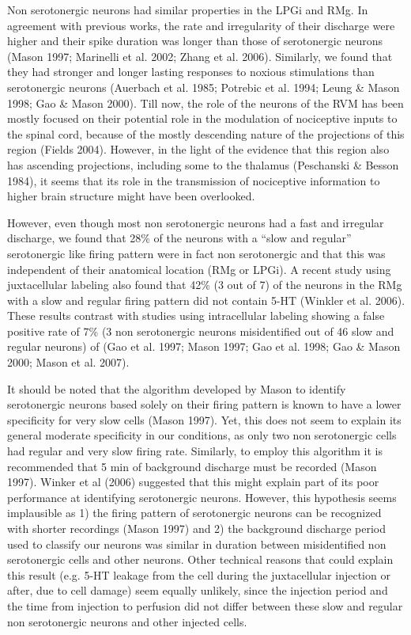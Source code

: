 \documentclass[a4paper,12pt,twoside]{report}
\begin{document}
Non serotonergic neurons had similar properties in the LPGi and RMg. In agreement with previous works, the rate and irregularity of their discharge were higher and their spike duration was longer than those of serotonergic neurons (Mason 1997; Marinelli et al. 2002; Zhang et al. 2006). Similarly, we found that they had stronger and longer lasting responses to noxious stimulations than serotonergic neurons (Auerbach et al. 1985; Potrebic et al. 1994; Leung \& Mason 1998; Gao \& Mason 2000). Till now, the role of the neurons of the RVM has been mostly focused on their potential role in the modulation of nociceptive inputs to the spinal cord, because of the mostly descending nature of the projections of this region (Fields 2004). However, in the light of the evidence that this region also has ascending projections, including some to the thalamus (Peschanski \& Besson 1984), it seems that its role in the transmission of nociceptive information to higher brain structure might have been overlooked. 

However, even though most non serotonergic neurons had a fast and irregular discharge, we found that 28\% of the neurons with a “slow and regular” serotonergic like firing pattern were in fact non serotonergic and that this was independent of their anatomical location (RMg or LPGi). A recent study using juxtacellular labeling also found that 42\% (3 out of 7) of the neurons in the RMg with a slow and regular firing pattern did not contain 5-HT (Winkler et al. 2006). These results contrast with studies using intracellular labeling showing a false positive rate of 7\% (3 non serotonergic neurons misidentified out of 46 slow and regular neurons) of (Gao et al. 1997; Mason 1997; Gao et al. 1998; Gao \& Mason 2000; Mason et al. 2007). 

It should be noted that the algorithm developed by Mason to identify serotonergic neurons based solely on their firing pattern is known to have a lower specificity for very slow cells (Mason 1997). Yet, this does not seem to explain its general moderate specificity in our conditions, as only two non serotonergic cells had regular and very slow firing rate. Similarly, to employ this algorithm it is recommended that 5 min of background discharge must be recorded (Mason 1997). Winker et al (2006) suggested that this might explain part of its poor performance at identifying serotonergic neurons. However, this hypothesis seems implausible as 1) the firing pattern of serotonergic neurons can be recognized with shorter recordings (Mason 1997) and 2) the background discharge period used to classify our neurons was similar in duration between misidentified non serotonergic cells and other neurons. Other technical reasons that could explain this result (e.g. 5-HT leakage from the cell during the juxtacellular injection or after, due to cell damage) seem equally unlikely, since the injection period and the time from injection to perfusion did not differ between these slow and regular non serotonergic neurons and other injected cells. 
\end{document}
